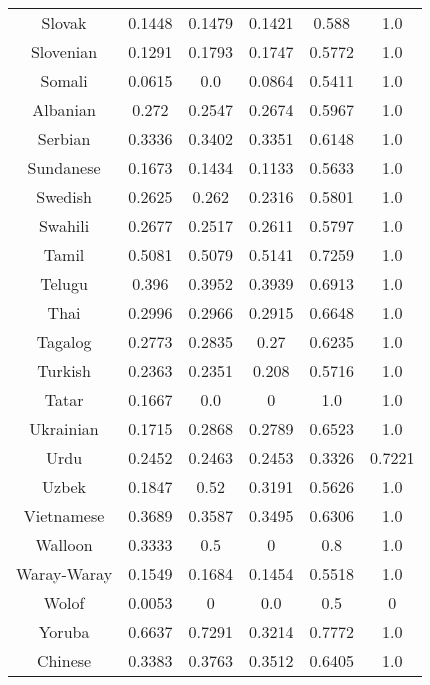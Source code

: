 \begin{figure}[h]
\begin{tabular}{cccccc}
Slovak&0.1448&0.1479&0.1421&0.588&1.0\\
Slovenian&0.1291&0.1793&0.1747&0.5772&1.0\\
Somali&0.0615&0.0&0.0864&0.5411&1.0\\
Albanian&0.272&0.2547&0.2674&0.5967&1.0\\
Serbian&0.3336&0.3402&0.3351&0.6148&1.0\\
Sundanese&0.1673&0.1434&0.1133&0.5633&1.0\\
Swedish&0.2625&0.262&0.2316&0.5801&1.0\\
Swahili&0.2677&0.2517&0.2611&0.5797&1.0\\
Tamil&0.5081&0.5079&0.5141&0.7259&1.0\\
Telugu&0.396&0.3952&0.3939&0.6913&1.0\\
Thai&0.2996&0.2966&0.2915&0.6648&1.0\\
Tagalog&0.2773&0.2835&0.27&0.6235&1.0\\
Turkish&0.2363&0.2351&0.208&0.5716&1.0\\
Tatar&0.1667&0.0&0&1.0&1.0\\
Ukrainian&0.1715&0.2868&0.2789&0.6523&1.0\\
Urdu&0.2452&0.2463&0.2453&0.3326&0.7221\\
Uzbek&0.1847&0.52&0.3191&0.5626&1.0\\
Vietnamese&0.3689&0.3587&0.3495&0.6306&1.0\\
Walloon&0.3333&0.5&0&0.8&1.0\\
Waray-Waray&0.1549&0.1684&0.1454&0.5518&1.0\\
Wolof&0.0053&0&0.0&0.5&0\\
Yoruba&0.6637&0.7291&0.3214&0.7772&1.0\\
Chinese&0.3383&0.3763&0.3512&0.6405&1.0\\
\hline\hline
\end{tabular}
\end{figure}
